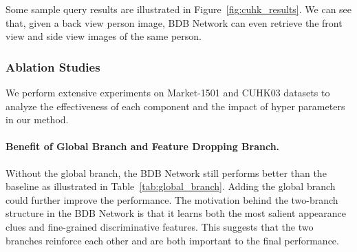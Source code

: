 Some sample query results are illustrated in Figure~\ref{fig:cuhk_results}. We can see that, given a back view person image, BDB Network can even retrieve the front view and side view images of the same person.
\vspace{-3mm}
\subsubsection{Ablation Studies}
We perform extensive experiments on Market-1501 and CUHK03 datasets to analyze the effectiveness of each component and the impact of hyper parameters in our method.

\begin{table}[]
    \begin{center}
    \end{center}
    \vspace{-4mm}
    \caption{The effect of global branch and feature dropping branch on Market-1501 dataset. `Cut' means Cutout~\cite{devries2017improved} augmentation.}
    \label{tab:global_branch}
    \vspace{1mm}
\end{table}



\paragraph{Benefit of Global Branch and Feature Dropping Branch.}\vspace{-4mm}
Without the global branch, the BDB Network still performs better than the baseline as illustrated in Table~\ref{tab:global_branch}. Adding the global branch could further improve the performance. The motivation behind the two-branch structure in the BDB Network is that it learns both the most salient appearance clues and fine-grained discriminative features. This suggests that the two branches reinforce each other and are both important to the final performance.

